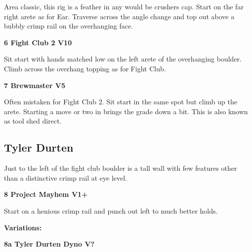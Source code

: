 \begin{multicols}{2}
\begin{minipage}{\linewidth}
					\begin{adjustwidth}{0.5cm}{}				
					Area classic, this rig is a feather in any would be crushers cap. Start on the far right arete as for Ear. Traverse across the angle change and top out above a bubbly crimp rail on the overhanging face.
					\end{adjustwidth}
					\end{minipage}

					\begin{minipage}{\linewidth}	
					\label{rt:Fight Club 2}
\colorbox{red!20}{
\parbox{0.95\textwidth}{
\textbf{
6 Fight Club 2 V10    
}
}
}

					\begin{adjustwidth}{0.5cm}{}				
					Sit start with hands matched low on the left arete of the overhanging boulder. Climb across the overhang topping as for Fight Club.
					\end{adjustwidth}
					\end{minipage}
					\begin{minipage}{\linewidth}	
					\label{rt:Brewmaster}
\colorbox{RoyalBlue!20}{
\parbox{0.95\textwidth}{
\textbf{
7 Brewmaster V5    
}
}
}

					\begin{adjustwidth}{0.5cm}{}				
					Often mistaken for Fight Club 2. Sit start in the same spot but climb up the arete. Starting a move or two in brings the grade down a bit. This is also known as tool shed direct.
					\end{adjustwidth}
					\end{minipage}
			\begin{minipage}{\columnwidth}
			\subsection*{Tyler Durten}\label{bf:Tyler Durten}
			Just to the left of the fight club boulder is a tall wall with few features other than a distinctive crimp rail at eye level.
			
			\end{minipage}
			
					\begin{minipage}{\linewidth}	
					\label{rt:Project Mayhem}
\colorbox{green!20}{
\parbox{0.95\textwidth}{
\textbf{
8 Project Mayhem V1+   
}
}
}

					\begin{adjustwidth}{0.5cm}{}				
					Start on a henious crimp rail and punch out left to much better holds.
					\end{adjustwidth}
					\end{minipage}
						\begin{adjustwidth}{0.5cm}{}				
						\textbf{Variations:} \newline
							\begin{minipage}{\linewidth}	
							\label{vr:Tyler Durten Dyno}
\colorbox{black!20}{
\parbox{0.95\textwidth}{
\textbf{
8a Tyler Durten Dyno V?  
}
}
}


\end{minipage}
\end{adjustwidth}
\end{multicols}
